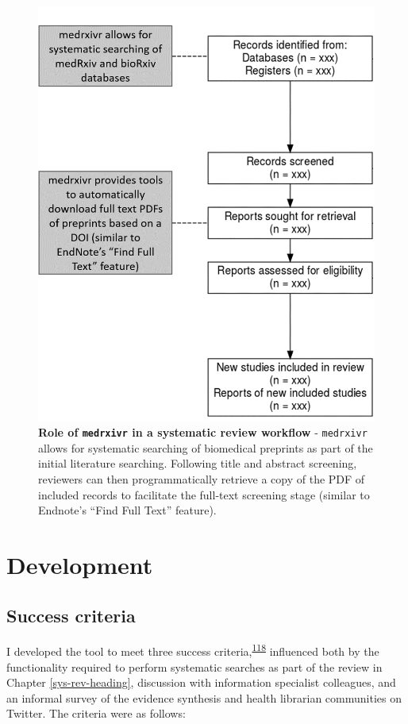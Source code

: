 \documentclass[a4paper, twoside]{templates/ociamthesis}
\begin{document}
\begin{figure}

{\centering \includegraphics[width=0.65\linewidth]{figures/sys-rev-tools/medrxiv-role} 

}

\caption[Role of \texttt{medrxivr} in a systematic review workflow]{\textbf{Role of \texttt{medrxivr} in a systematic review workflow} - \texttt{medrxivr} allows for systematic searching of biomedical preprints as part of the initial literature searching. Following title and abstract screening, reviewers can then programmatically retrieve a copy of the PDF of included records to facilitate the full-text screening stage (similar to Endnote's ``Find Full Text'' feature).}\label{fig:medrxivr-sr}
\end{figure}

\hypertarget{development}{%
\section{Development}\label{development}}

\hypertarget{success-criteria}{%
\subsection{Success criteria}\label{success-criteria}}

I developed the tool to meet three success criteria,\textsuperscript{\protect\hyperlink{ref-wateridge1995}{118}} influenced both by the functionality required to perform systematic searches as part of the review in Chapter \ref{sys-rev-heading}, discussion with information specialist colleagues, and an informal survey of the evidence synthesis and health librarian communities on Twitter. The criteria were as follows:
\end{document}
